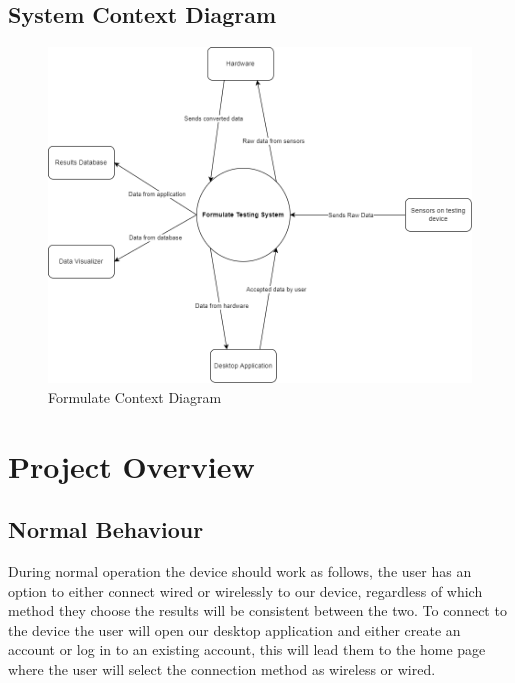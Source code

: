 \documentclass[12pt, titlepage]{article}
\begin{document}
\newpage

\subsection{System Context Diagram}
\begin{figure}[h!]
  \begin{center}
  \includegraphics[width=1.1\textwidth]{sys_context_diagram}
  \caption{Formulate Context Diagram}
  \end{center}
  \end{figure}
  \newpage

\section{Project Overview}

\subsection{Normal Behaviour}
During normal operation the device should work as follows, the user has an option to either connect wired or wirelessly to our device, regardless of which method they choose the results will be consistent between the two. To connect to the device the user will open our desktop application and either create an account or log in to an existing account, this will lead them to the home page where the user will select the connection method as wireless or wired.\\
\end{document}
